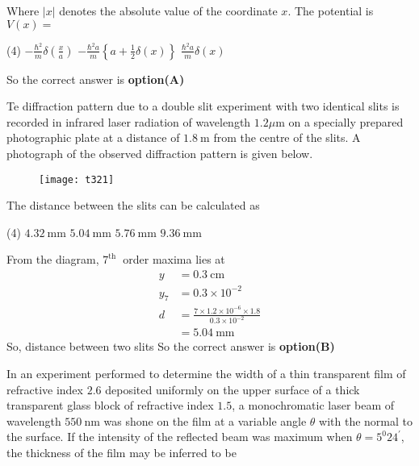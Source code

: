 \begin{questions}
\begin{minipage}{\textwidth}
$$	$$
	Where $|x|$ denotes the absolute value of the coordinate $x .$ The potential is $V(x)=$
\end{minipage}
\begin{tasks}(4)
	\task[\textbf{A.}] $-\frac{\hbar^{2}}{m} \delta\left(\frac{x}{a}\right)$
	\task[\textbf{B.}]   $-\frac{\hbar^{2} a}{m}\left\{a+\frac{1}{2} \delta(x)\right\}$
	\task[\textbf{C.}] $\frac{\hbar^{2} a}{m} \delta(x)$
\end{tasks}
\begin{answer}
	So the correct answer is \textbf{option(A)}
\end{answer}
\begin{minipage}{\textwidth}
	\question Te diffraction pattern due to a double slit experiment with two identical slits is recorded in infrared laser radiation of wavelength $1.2 \mu \mathrm{m}$ on a specially prepared photographic plate at a distance of $1.8 \mathrm{~m}$ from the centre of the slits. A photograph of the observed diffraction pattern is given below.\\
	\begin{figure}[H]
		\centering
		\texttt{[image: t321]}
	\end{figure}
	The distance between the slits can be calculated as
\end{minipage}
\begin{tasks}(4)
	\task[\textbf{A.}]   $4.32 \mathrm{~mm}$
	\task[\textbf{B.}] $5.04 \mathrm{~mm}$
	\task[\textbf{C.}] $5.76 \mathrm{~mm}$
	\task[\textbf{D.}] $9.36 \mathrm{~mm}$
\end{tasks}
\begin{answer}
	From the diagram, $7^{\text {th }}$ order maxima lies at
	$$
	\begin{aligned}
	y &=0.3 \mathrm{~cm} \\
	y_{7} &=0.3 \times 10^{-2} \\
	d &=\frac{7 \times 1.2 \times 10^{-6} \times 1.8}{0.3 \times 10^{-2}} \\
	&=5.04 \mathrm{~mm}
	\end{aligned}
	$$
	So, distance between two slits
	So the correct answer is \textbf{option(B)}
\end{answer}
\begin{minipage}{\textwidth}
	\question In an experiment performed to determine the width of a thin transparent film of refractive index $2.6$ deposited uniformly on the upper surface of a thick transparent glass block of refractive index $1.5$, a monochromatic laser beam of wavelength $550 \mathrm{~nm}$ was shone on the film at a variable angle $\theta$ with the normal to the surface. If the intensity of the reflected beam was maximum when $\theta=5^{0} 24^{\prime}$, the thickness of the film may be inferred to be

\end{minipage}
\end{questions}
